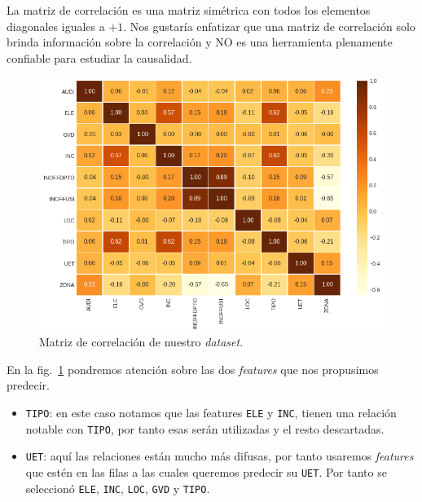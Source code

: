 \documentclass[a4paper,12pt]{article}
\begin{document}
		\clearpage				
						
		La matriz de correlación es una matriz simétrica con todos los elementos diagonales iguales a $+1$. Nos gustaría enfatizar que una matriz de correlación solo brinda información sobre la correlación y NO es una herramienta plenamente confiable para estudiar la causalidad. 
						
		\begin{figure}[H]
			\begin{center}
				\includegraphics[width=1\textwidth]{corrmatrix.png}
				\caption{Matriz de correlación de nuestro \textit{dataset}.}
				\label{fig:corrmatrix}
			\end{center}
		\end{figure}
						
		En la fig.~\ref{fig:corrmatrix} pondremos atención sobre las dos \textit{features} que nos propusimos predecir.
						
		\begin{itemize}[noitemsep, topsep=2pt]
			\item \texttt{TIPO}: en este caso notamos que las features \texttt{ELE} y \texttt{INC}, tienen una relación notable con \texttt{TIPO}, por tanto esas serán utilizadas y el resto descartadas.
			\item \texttt{UET}: aquí las relaciones están mucho más difusas, por tanto usaremos \textit{features} que estén en las filas a las cuales queremos predecir su \texttt{UET}. Por tanto se seleccionó \texttt{ELE}, \texttt{INC}, \texttt{LOC}, \texttt{GVD} y \texttt{TIPO}.
		\end{itemize}
				
\end{document}
